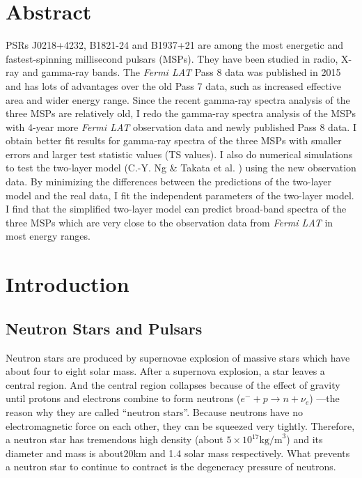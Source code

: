 \documentclass[12pt]{report}
\begin{document}
\chapter*{Abstract}
  \doublespacing
  PSRs J0218+4232, B1821-24 and B1937+21 are among the most energetic and fastest-spinning 
  millisecond pulsars (MSPs). They have been studied in radio, X-ray and gamma-ray bands. 
  The \textit{Fermi LAT} Pass 8 data was published in 2015 and has lots of advantages over 
  the old Pass 7 data, such as increased effective area and wider energy range. Since 
  the recent gamma-ray spectra analysis of the three MSPs are relatively old, 
  I redo the gamma-ray spectra analysis of the MSPs with 
  4-year more \textit{Fermi LAT} observation data and newly published Pass 8 data. 
  I obtain better fit results for gamma-ray spectra of the three MSPs with smaller errors 
  and larger test statistic values (TS values). I also do numerical simulations to test the 
  two-layer model (C.-Y. Ng \& Takata et al. \cite{0004-637X-787-2-167}) using the new 
  observation data. By minimizing the differences between the predictions of the two-layer 
  model and the real data, I fit the independent parameters of the two-layer model. I find that
  the simplified two-layer model can predict broad-band spectra of the three 
  MSPs which are very close to the observation data from \textit{Fermi LAT} in most energy
  ranges.
			
\cleardoublepage
{}
\newpage

\cleardoublepage
{}
\newpage
\tableofcontents


\listoffigures
 
\cleardoublepage
\newpage
\listoftables


\chapter{Introduction}   	   
  \section{Neutron Stars and Pulsars}
    Neutron stars are produced by supernovae explosion of massive stars which have about four 
    to eight solar mass. After a supernova explosion, a star leaves a central region. 
    And the central region collapses because of the effect of 
    gravity until protons and electrons combine to form neutrons 
    ($e^{-}+p\rightarrow n+\nu_{e}$) ---the reason why they are called ``neutron stars''.  
    Because neutrons have no electromagnetic force on each other, they can be squeezed very 
    tightly. Therefore, a neutron star has tremendous high density 
    (about $5\times 10^{17} \mbox{kg/m}^3$) and its diameter and mass is about20km and 
    1.4 solar mass respectively. What
    prevents a neutron star to continue to contract is the degeneracy pressure of neutrons. 
    
\end{document}
